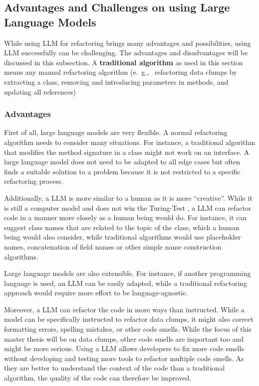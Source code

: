 \subsection{Advantages and Challenges on using Large Language Models}\label{sec:llm_challenges}

While using  \ac{LLM} for refactoring brings many advantages  and possibilities, using \ac{LLM}  successfully can be challenging. The advantages and disadvantages will be discussed in this subsection. A \textbf{traditional algorithm} as used in this section means any manual refactoring algorithm (e.~g.,~ refactoring data clumps by extracting a class, removing and introducing parameters in methods, and updating all references)

\subsubsection{Advantages}

First of all, large language models are very flexible. A normal refactoring algorithm needs to consider many situations. For instance, a traditional algorithm that modifies the method signature in a class might not work on an interface. A large language model does not need to be adapted to all edge cases but often finds a suitable solution to a problem because it is not restricted to a specific refactoring process. \cite{shirafuji2023refactoring}

Additionally, a \ac{LLM} is more similar to a human as it is more  \enquote{creative}. While it is still a computer model and does not win the Turing-Test \cite{turing_test}, a \ac{LLM} can refactor code in a manner more closely as a human being would do. For instance, it can suggest class names that are related to the topic of the class, which a human being would also consider, while traditional algorithms would use placeholder names, concatenation of field names or other simple name construction algorithms. \cite{shirafuji2023refactoring}

Large language models are also extensible. For instance, if another programming language is used, an \ac{LLM} can be easily adapted, while a traditional refactoring approach would require more effort to be language-agnostic.

Moreover, a \ac{LLM} can refactor the code in more ways than instructed. While a model can be specifically instructed to refactor data clumps, it might also correct formatting errors, spelling mistakes, or other code smells. While the focus of this master thesis will be on data clumps, other code smells are important too and might be more serious. Using a  \ac{LLM} allows developers to fix more code smells without developing and testing more tools to refactor multiple code smells. As they are better to understand the context of the code than a traditional algorithm, the quality of the code can therefore be improved. \cite{shirafuji2023refactoring}

